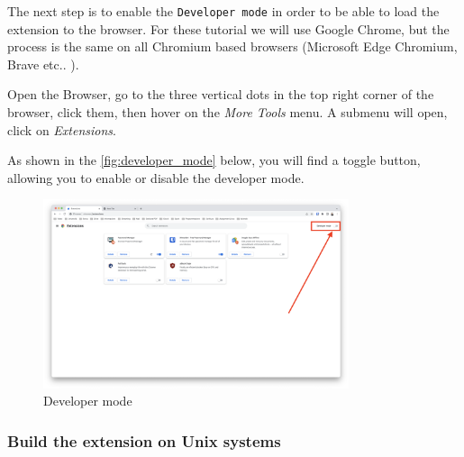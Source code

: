 The next step is to enable the \texttt{Developer mode} in order to be able to load the extension to the browser. For these tutorial we will use Google Chrome, but the process is the same on all Chromium based browsers (Microsoft Edge Chromium, Brave etc.. ).

Open the Browser, go to the three vertical dots in the top right corner of the browser, click them, then hover on the \textit{More Tools} menu. A submenu will open, click on \textit{Extensions}.

As shown in the \autoref{fig:developer_mode} below, you will find a toggle button, allowing you to enable or disable the developer mode.

\begin{figure}[htb]
	\centering
	\includegraphics[width=0.8\textwidth]{images/extension/developer-mode.png}
	\caption{Developer mode}
	\label{fig:developer_mode}
\end{figure}

\subsubsection{Build the extension on Unix systems}

